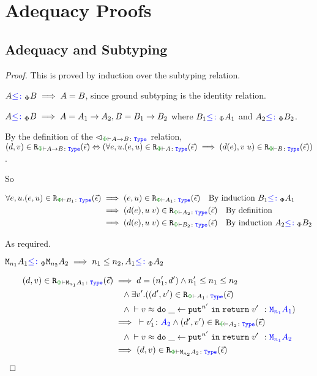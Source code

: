 \chapter{Adequacy Proofs}

\section{Adequacy and Subtyping}
\label{AdequacySubtypingProof}

\begin{proof}
    This is proved by induction over the subtyping relation.

    \case{\sground}
    $A{\color{blue} \leq\colon}_\Phi B\implies A = B$, since ground subtyping is the identity relation.

\case{\sfun}
    $A{\color{blue} \leq\colon}_\Phi B\implies A = A_1\rightarrow A_2, B = B_1\rightarrow B_2$ where $B_1{\color{blue} \leq\colon}_\Phi A_1$ and $A_2{\color{blue} \leq\colon}_\Phi B_2$.

    By the definition of the $\relates_{\wellformedt{\P}{\ab}}$ relation, $\inLogRelPE{d}{v}{\ab} \Leftrightarrow (\forall e, u. \inLogRelPE{e}{u}{A}\implies \inLogRelPE{d(e)}{\apply{v}{u}}{B})$.

    So 

    \begin{align*}
        \forall e, u. \inLogRelPE{e}{u}{B_1} & \implies \inLogRelPE{e}{u}{A_1} \qt{By induction $B_1\subtypep A_1$}\\
        & \implies \inLogRelPE{d(e)}{\apply{u}{v}}{A_2}\qt{By definition}\\
        & \implies \inLogRelPE{d(e)}{\apply{u}{v}}{B_2}\qt{By induction $A_2\subtypep B_2$}
    \end{align*}

    As required.
\case{\seffect}

$\texttt{M}_{n_1}{A_1} {\color{blue} \leq\colon}_\Phi \texttt{M}_{n_2}{A_2} \implies n_1\leq n_2, A_1{\color{blue} \leq\colon}_\Phi A_2$

\begin{align*}
    \inLogRelPE{d}{v}{\M{n_1}{A_1}} & \implies  d=(n_1', d') \wedge n_1' \leq n_1\leq n_2 
    \\ & \quad\wedge \exists v'. (\inLogRelPE{d'}{v'}{A_1} 
    \\ & \quad\wedge\zberelation{v}{\doin{\_}{\put^{n'}}{\return{v'}}}{\M{n_1}{A_1}})
    \\
    & \implies \ztyperelation{v_1'}{A_2} \wedge \inLogRelPE{d'}{v'}{A_2} 
    \\ & \quad 
    \wedge \zberelation{v}{\doin{\_}{\put^{n'}}{\return{v'}}}{\M{n_1}{A_2}}
    \\
    & \implies \inLogRelPE{d}{v}{\M{n_2}{A_2}}
\end{align*}


\end{proof}
